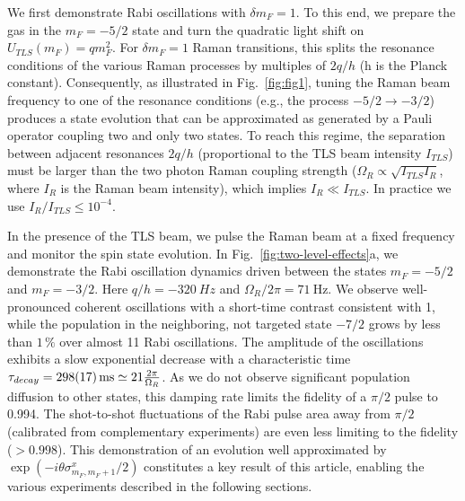 We first demonstrate Rabi oscillations with $\delta m_F = 1$. To this end, we prepare the gas in the $m_F = -5/2$ state and turn the quadratic light shift on $U_{TLS}(m_F) = q m_F^2$. For $\delta m_F = 1$ Raman transitions, this splits the resonance conditions of the various Raman processes by multiples of $2 q /h $ (h is the Planck constant). Consequently, as illustrated in Fig.~\ref{fig:fig1}, tuning the Raman beam frequency to one of the resonance conditions (e.g., the process $-5/2 \rightarrow -3/2$) produces a state evolution that can be approximated as generated by a Pauli operator coupling two and only two states. To reach this regime, the separation between adjacent resonances $2 q /h$ (proportional to the TLS beam intensity $I_{TLS}$) must be larger than the two photon Raman coupling strength ($\Omega_R \propto \sqrt{I_{TLS} I_R}$, where $I_R$ is the Raman beam intensity), which implies $I_R \ll I_{TLS}$. In practice we use $I_R / I_{TLS} \le 10^{-4}$. 

In the presence of the TLS beam, we pulse the Raman beam at a fixed frequency and monitor the spin state evolution. In Fig.~\ref{fig:two-level-effects}a, we demonstrate the Rabi oscillation dynamics driven between the states $m_F = -5/2$ and $m_F = -3/2$. Here $q / h = -\SI{320}{Hz}$ and $\Omega_R / 2 \pi = \SI{71}{\hertz}$. We observe well-pronounced coherent oscillations with a short-time contrast consistent with 1, while the population in the neighboring, not targeted state $-7/2$ grows by less than $1\,\%$ over almost 11 Rabi oscillations. The amplitude of the oscillations exhibits a slow exponential decrease with a characteristic time $\tau_{decay} = \SI{298 \pm 17}{\milli \second} \simeq 21 \frac{2 \pi}{\Omega_R}$. As we do not observe significant population diffusion to other states, this damping rate limits the fidelity of a $\pi/2$ pulse to 0.994. The shot-to-shot fluctuations of the Rabi pulse area away from $\pi/2$ (calibrated from complementary experiments) are even less limiting to the fidelity ($> 0.998$). This demonstration of an evolution well approximated by $\exp{\left( - i \theta \sigma^x_{m_F, m_F+1} /2\right)}$ constitutes a key result of this article, enabling the various experiments described in the following sections.  

